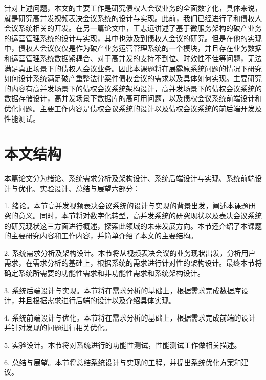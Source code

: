 针对上述问题，本文的主要工作是研究债权人会议业务的全面数字化，具体来说，就是研究高并发视频表决会议系统的设计与实现。此前，我们已经进行了和债权人会议系统相关的开发。在另一篇论文中，王志远\cite{Wang2021}讲述了基于微服务架构的破产业务的运营管理系统的设计与实现，其中也涉及到债权人会议的研究。但是在他的实现中，债权人会议仅仅是作为破产业务运营管理系统的一个模块，并且存在业务数据和运营管理系统数据紧耦合、对于高并发的支持不到位、时效性不佳等问题，无法满足真正场景下的债权人会议业务。因此本课题将在展露原系统问题的情况下研究如何设计系统满足破产重整法律案件债权会议的需求以及具体如何实现。主要研究的内容有高并发场景下的债权会议系统架构设计，高并发场景下的债权会议系统的数据存储设计，高并发场景下数据库的高可用问题，以及债权会议系统前端设计和优化问题。主要工作内容是债权会议系统的设计以及债权会议系统的前后端开发及性能测试。

\section{本文结构}
本篇论文分为绪论、系统需求分析及架构设计、系统后端设计与实现、系统前端设计与优化、实验设计、总结与展望六部分：

1. 绪论。本节高并发视频表决会议系统的设计与实现的背景出发，阐述本课题研究的意义。同时，本节将对数字化转型，高并发系统的研究现状以及表决会议系统的研究现状这三方面进行概述，探索此领域的未来发展方向。本节还介绍了本课题的主要研究内容和工作内容，并简单介绍了本文的主要结构。

2. 系统需求分析及架构设计。本节将从视频表决会议的业务现状出发，分析用户需求，在需求分析的基础上，根据系统的需求进行针对性的架构设计。最终本节将确定系统所需要的功能性需求和非功能性需求和系统架构设计。

3. 系统后端设计与实现。本节将在需求分析的基础上，根据需求完成数据库设计，并且根据需求进行后端的设计以及介绍具体实现。

4. 系统前端设计与优化。本节将在需求分析的基础上，根据需求完成前端的设计并针对发现的问题进行相关优化。

5. 实验设计。本节将对系统进行的功能性测试，性能测试工作做相关描述。

6. 总结与展望。本节将总结系统设计与实现的工程，并提出系统优化方案和建议。

